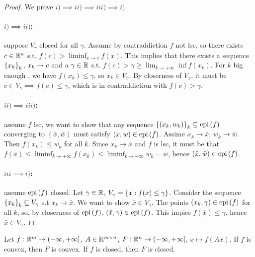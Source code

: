 \begin{proof}
    
    We prove $i) \implies ii) \implies iii) \implies i)$.

    \paragraph{$i) \implies ii)$:} suppose $V_\gamma$ closed for all $\gamma$. Assume by contraddiction $f$ not lsc, so there exists $c \in {\mathbb{R}^n}$ s.t. $f(c) > \liminf_{x \to c} f(x)$. This implies that there exists a sequence $\left\{ x_k \right\}_k,\, x_k \to c$ and a $\gamma \in \mathbb{R}$ s.t. $f(c) > \gamma \ge \displaystyle\lim_{k \to +\infty} \inf f(x_k)$. For $k$ big enough , we have $f(x_k) \le \gamma$, so $x_k \in V_\gamma$. By closerness of $V_\gamma$, it must be $c \in V_\gamma \implies f(c) \le \gamma$, which is in contraddiction with $f(c) > \gamma$.

    \paragraph{$ii) \implies iii)$:} assume $f$ lsc, we want to show that any sequence $\left\{ (x_k,w_k) \right\}_k \subseteq \mathrm{epi}\left(f\right)$ converging to $(\bar{x},\bar{w})$ must satisfy $(x,w) \in \mathrm{epi}\left(f\right)$. Assime $x_k \to \bar{x},\, w_k \to \bar{w}$. Then $f(x_k) \le w_k$ for all $k$. Since $x_k \to \bar{x}$ and $f$ is lsc, it must be that $f(\bar{x}) \le \displaystyle\liminf_{k \to +\infty} f(x_k) \le \displaystyle\liminf_{k \to +\infty} w_k = \bar{w}$, hence $(\bar{x},\bar{w}) \in \mathrm{epi}\left(f\right)$.

    \paragraph{$iii \implies i)$:} assume $\mathrm{epi}\left(f\right)$ closed. Let $\gamma \in \mathbb{R}$, $V_\gamma = \left\{ x : f(x) \le \gamma \right\}$. Consider the sequence $\left\{ x_k \right\}_k \subseteq V_\gamma$ s.t $x_k \to \bar{x}$. We want to show $\bar{x} \in V_\gamma$. The points $(x_k,\gamma) \in \mathrm{epi}\left(f\right)$ for all $k$, so, by closerness of $\mathrm{epi}\left(f\right)$, $(\bar{x},\gamma) \in \mathrm{epi}\left(f\right)$. This impies $f(\bar{x}) \le \gamma$, hence $\bar{x} \in V_\gamma$.

\end{proof}

\begin{proposition}[Book 1.1.4]

    Let $f : \mathbb{R}^m \to (-\infty,+\infty]$, $A \in \mathbb{R}^{m \times n}$, $F : {\mathbb{R}^n} \to (-\infty,+\infty]$, $x \mapsto f(Ax)$. If $f$ is convex, then $F$ is convex. If $f$ is closed, then $F$ is closed.

\end{proposition}

